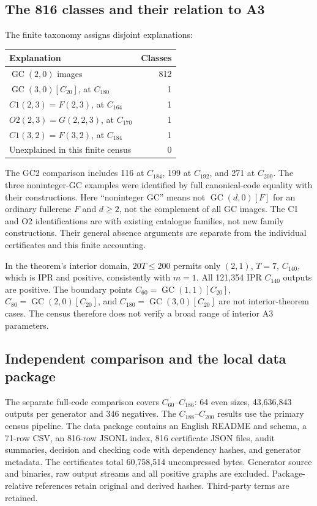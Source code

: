 \documentclass[11pt]{amsart}
\newcommand{\GC}{\operatorname{GC}}
\begin{document}
\subsection{The 816 classes and their relation to A3}
The finite taxonomy assigns disjoint explanations:
\begin{center}\small
\begin{tabular}{lr}\toprule
Explanation & Classes\\\midrule
$\GC(2,0)$ images &812\\
$\GC(3,0)[C_{20}]$, at $C_{180}$ &1\\
$C1(2,3)=F(2,3)$, at $C_{164}$ &1\\
$O2(2,3)=G(2,2,3)$, at $C_{170}$ &1\\
$C1(3,2)=F(3,2)$, at $C_{184}$ &1\\
Unexplained in this finite census &0\\\bottomrule
\end{tabular}\end{center}
The GC2 comparison includes 116 at $C_{184}$, 199 at $C_{192}$, and
271 at $C_{200}$. The three noninteger-GC examples were identified by
full canonical-code equality with their constructions. Here
``noninteger GC'' means not $\GC(d,0)[F]$ for an ordinary fullerene
$F$ and $d\ge2$, not the complement of all GC images. The C1 and O2
identifications are with existing catalogue families, not new family
constructions. Their general absence arguments are separate from the
individual certificates and this finite accounting.

In the theorem's interior domain, $20T\le200$ permits only $(2,1)$,
$T=7$, $C_{140}$, which is IPR and positive, consistently with $m=1$.
All 121,354 IPR $C_{140}$ outputs are positive. The boundary points
$C_{60}=\GC(1,1)[C_{20}]$, $C_{80}=\GC(2,0)[C_{20}]$, and
$C_{180}=\GC(3,0)[C_{20}]$ are not interior-theorem cases. The census
therefore does not verify a broad range of interior A3 parameters.

\subsection{Independent comparison and the local data package}
The separate full-code comparison covers $C_{60}$--$C_{186}$:
64 even sizes, 43,636,843 outputs per generator and 346 negatives.
The $C_{188}$--$C_{200}$ results use the primary census pipeline.
The data package contains an English README and schema, a 71-row CSV,
an 816-row JSONL index, 816 certificate JSON files, audit summaries,
decision and checking code with dependency hashes, and generator
metadata. The certificates total 60,758,514 uncompressed bytes.
Generator source and binaries, raw output streams and all positive
graphs are excluded. Package-relative references retain original and
derived hashes. Third-party terms are retained.
\end{document}
